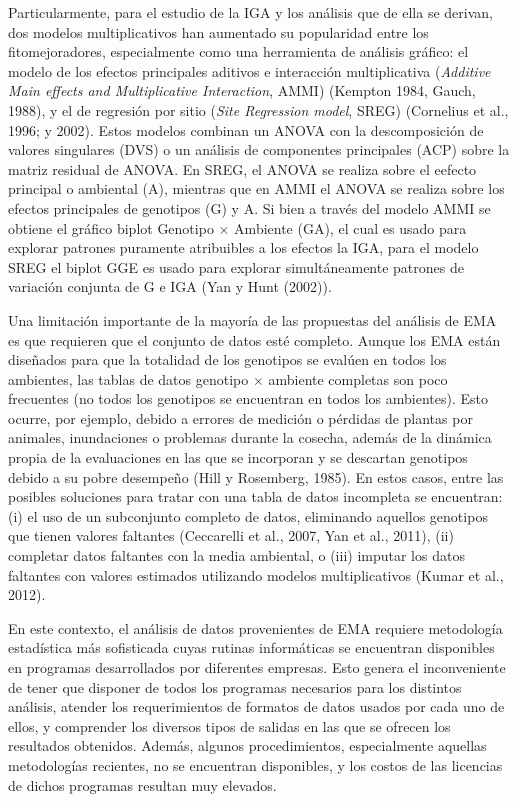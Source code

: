 Particularmente, para el estudio de la IGA y los análisis que de ella se derivan, dos modelos multiplicativos han aumentado su popularidad entre los fitomejoradores, especialmente como una herramienta de análisis gráfico: el modelo de los efectos principales aditivos e interacción multiplicativa (\emph{Additive Main effects and Multiplicative Interaction}, AMMI) (Kempton 1984, Gauch, 1988), y el de regresión por sitio (\emph{Site Regression model}, SREG) (Cornelius et al., 1996; \citet{GauchZobel1997} y 2002).  Estos modelos combinan un ANOVA con la descomposición de valores singulares (DVS) o un análisis de componentes principales (ACP) sobre la matriz residual de ANOVA. En SREG, el ANOVA se realiza sobre el eefecto principal o ambiental (A),  mientras que en AMMI el ANOVA se realiza sobre los efectos principales de genotipos (G) y A. Si bien a través del modelo AMMI se obtiene el gráfico biplot Genotipo $\times$ Ambiente (GA), el cual es usado para explorar patrones puramente atribuibles a los efectos la IGA, para el modelo SREG el biplot GGE es usado para explorar simultáneamente patrones de variación conjunta de G e IGA (Yan y Hunt (2002)).

Una limitación importante de la mayoría de las propuestas del análisis de EMA es que requieren que el conjunto de datos esté completo. Aunque los EMA están diseñados para que la totalidad de los genotipos se evalúen en todos los ambientes,  las tablas de datos genotipo $\times$ ambiente completas son poco frecuentes (no todos los genotipos se encuentran en todos los ambientes). Esto ocurre, por ejemplo, debido a errores de medición o pérdidas de plantas por animales, inundaciones o problemas durante la cosecha, además de la dinámica propia de la evaluaciones en las que se incorporan y se descartan genotipos debido a su pobre desempeño (Hill y Rosemberg, 1985). En estos casos, entre las posibles soluciones para tratar con una tabla de datos incompleta se encuentran: (i) el uso de un subconjunto completo de datos, eliminando aquellos genotipos que tienen valores faltantes (Ceccarelli et al., 2007, Yan et al., 2011), (ii) completar datos faltantes con la media ambiental, o (iii) imputar los datos faltantes con valores estimados utilizando modelos multiplicativos (Kumar et al., 2012). 



En este contexto, el análisis de datos provenientes de EMA requiere metodología estadística más sofisticada cuyas rutinas informáticas se encuentran disponibles en programas desarrollados por diferentes empresas. Esto genera el inconveniente de tener que disponer de todos los programas necesarios para los distintos análisis, atender los requerimientos de formatos de datos usados por cada uno de ellos, y comprender los diversos tipos de salidas en las que se ofrecen los resultados obtenidos. Además, algunos procedimientos, especialmente aquellas metodologías recientes, no se encuentran disponibles, y los costos de las licencias de dichos programas resultan muy elevados. 

